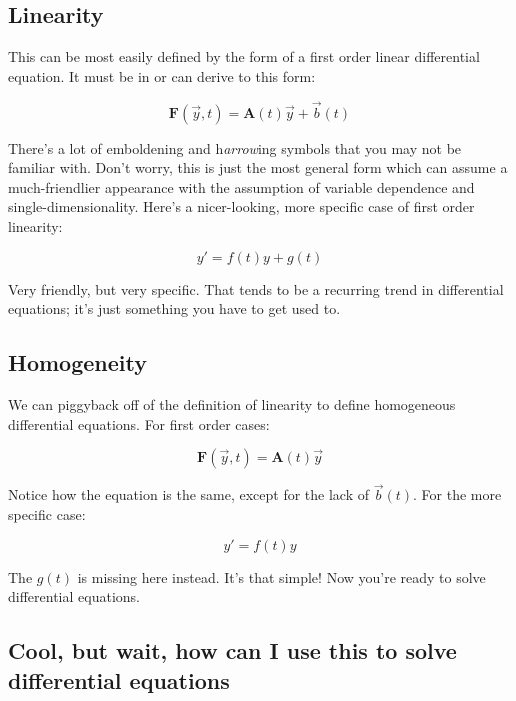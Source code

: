 \documentclass[10pt]{extarticle}
\begin{document}
\begin{multicols}{2}
\subsection{Linearity}

This can be most easily defined by the form of a first order linear
differential equation. It must be in or can derive to this form:

\begin{equation*}
    \mathbf{F}(\vec{y}, t) = \mathbf{A}(t)\vec{y} + \vec{b}(t)
\end{equation*}

There's a lot of emboldening and h{\em arrow}ing symbols that you may not be
familiar with. Don't worry, this is just the most general form which can assume
a much-friendlier appearance with the assumption of variable dependence and
single-dimensionality. Here's a nicer-looking, more specific case of first
order linearity:

\begin{equation*}
   y' = f(t)y + g(t) 
\end{equation*}

Very friendly, but very specific. That tends to be a recurring trend in
differential equations; it's just something you have to get used to.


\subsection{Homogeneity}

We can piggyback off of the definition of linearity to define homogeneous
differential equations. For first order cases:

\begin{equation*}
    \mathbf{F}(\vec{y}, t) = \mathbf{A}(t)\vec{y}
\end{equation*}

Notice how the equation is the same, except for the lack of \(\vec{b}(t)\). For
the more specific case:

\begin{equation*}
   y' = f(t)y 
\end{equation*}

The \(g(t)\) is missing here instead. It's that simple! Now you're ready to
solve differential equations.


\subsection{Cool, but wait, how can I use this to solve differential
equations\textinterrobang}


\end{multicols}
\end{document}
